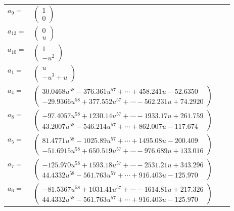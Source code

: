 \documentclass[1p]{elsarticle_modified}
\theoremstyle{definition}
\begin{document}
\begin{tabular}{m{7pt} m{180pt} m{7pt} m{180pt} }
\flushright $a_{9}=$&$\begin{pmatrix}1\\0\end{pmatrix}$ \\
\flushright $a_{12}=$&$\begin{pmatrix}0\\u\end{pmatrix}$ \\
\flushright $a_{10}=$&$\begin{pmatrix}1\\- u^2\end{pmatrix}$ \\
\flushright $a_{1}=$&$\begin{pmatrix}u\\- u^3+u\end{pmatrix}$ \\
\flushright $a_{4}=$&$\begin{pmatrix}30.0468 u^{58}-376.361 u^{57}+\cdots+458.241 u-52.6350\\-29.9366 u^{58}+377.552 u^{57}+\cdots-562.231 u+74.2920\end{pmatrix}$ \\
\flushright $a_{8}=$&$\begin{pmatrix}-97.4057 u^{58}+1230.14 u^{57}+\cdots-1933.17 u+261.759\\43.2007 u^{58}-546.214 u^{57}+\cdots+862.007 u-117.674\end{pmatrix}$ \\
\flushright $a_{5}=$&$\begin{pmatrix}81.4771 u^{58}-1025.89 u^{57}+\cdots+1495.08 u-200.409\\-51.6915 u^{58}+650.519 u^{57}+\cdots-976.689 u+133.016\end{pmatrix}$ \\
\flushright $a_{7}=$&$\begin{pmatrix}-125.970 u^{58}+1593.18 u^{57}+\cdots-2531.21 u+343.296\\44.4332 u^{58}-561.763 u^{57}+\cdots+916.403 u-125.970\end{pmatrix}$ \\
\flushright $a_{6}=$&$\begin{pmatrix}-81.5367 u^{58}+1031.41 u^{57}+\cdots-1614.81 u+217.326\\44.4332 u^{58}-561.763 u^{57}+\cdots+916.403 u-125.970\end{pmatrix}$ \\

\end{tabular}
\end{document}
